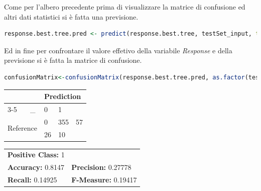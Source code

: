 \documentclass[letterpaper,11pt]{article}
\begin{document}
Come per l'albero precedente prima di visualizzare la matrice di confusione ed altri dati statistici si è fatta una previsione.

\begin{lstlisting}[language=R]
response.best.tree.pred <- predict(response.best.tree, testSet_input, type = "class")
\end{lstlisting}

Ed in fine per confrontare il valore effetivo della variabile \textit{Response} e della previsione si è fatta la matrice di confusione. 

\begin{lstlisting}[language=R]
confusionMatrix<-confusionMatrix(response.best.tree.pred, as.factor(testSet_input$Response), positive = "1", mode = "prec_recall") 
\end{lstlisting}

\begin{table}[h!]
\centering
\begin{tabular}{|ll|lll|}
\hline
\multicolumn{2}{|l|}{\multirow{2}{*}{}} & \multicolumn{3}{l|}{Prediction}                        \\ \cline{3-5} 
\multicolumn{2}{|l|}{}                  & \multicolumn{1}{c|}{\_} & \multicolumn{1}{l|}{0}  & 1  \\ \hline
\multicolumn{2}{|l|}{\multirow{2}{*}{Reference}} & \multicolumn{1}{l|}{0} & \multicolumn{1}{l|}{355} & 57 \\ \cline{3-5} 
\multicolumn{2}{|l|}{}                  & \multicolumn{1}{l|}{1} & \multicolumn{1}{l|}{26} & 10 \\ \hline
\end{tabular}
\end{table}

\begin{table}[h!]
\centering
\begin{tabular}{ll}
\multicolumn{2}{l}{\textbf{Positive Class:} 1} \\
\textbf{Accuracy:} 0.8147 & \textbf{Precision:} 0.27778\\
\textbf{Recall:} 0.14925 & \textbf{F-Measure:} 0.19417
\end{tabular}
\end{table}





\end{document}
